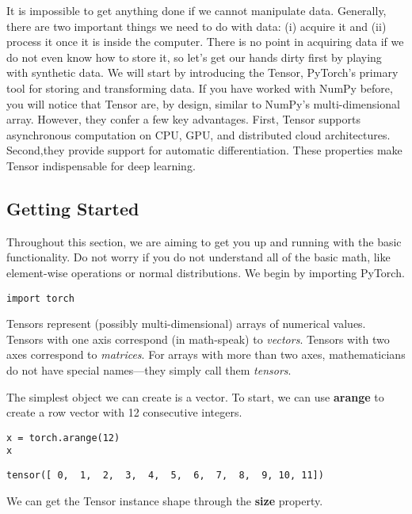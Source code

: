 \documentclass[]{article}
\begin{document}
It is impossible to get anything done if we cannot manipulate data. Generally, there are two important things we need to do with data: (i) acquire it and (ii) process it once it is inside the computer.  There is no point in acquiring data if we do not even know how to store it, so let’s get our hands dirty first by playing with synthetic data. We will start by introducing the Tensor, PyTorch’s primary tool for storing and transforming data.  If you have worked with NumPy before, you will notice that Tensor are, by design, similar to NumPy’s multi-dimensional array.  However, they confer a few key advantages.  First, Tensor supports asynchronous computation on CPU, GPU, and distributed cloud architectures. Second,they provide support for automatic differentiation. These properties make Tensor indispensable for deep learning.

\subsection{Getting Started}

Throughout this section, we are aiming to get you up and running with the basic functionality. Do not worry if you do not understand all of the basic math, like element-wise operations or normal distributions. We begin by importing PyTorch.

\begin{verbatim}
import torch
\end{verbatim}

Tensors represent (possibly multi-dimensional) arrays of numerical values. Tensors with one axis correspond (in math-speak) to \textit{vectors}. Tensors with two axes correspond to \textit{matrices}. For arrays with more than two axes, mathematicians do not have special names—they simply call them \textit{tensors}.

The simplest object we can create is a vector. To start, we can use \textbf{arange} to create a row vector with 12 consecutive integers.

\begin{verbatim}
x = torch.arange(12)
x
\end{verbatim}

\begin{verbatim}
tensor([ 0,  1,  2,  3,  4,  5,  6,  7,  8,  9, 10, 11])
\end{verbatim}

We can get the Tensor instance shape through the \textbf{size} property.
\end{document}

